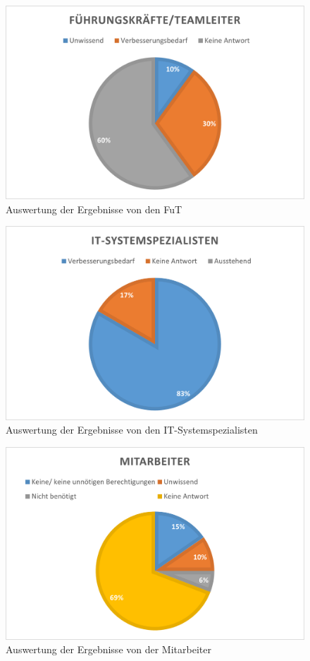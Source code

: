 \begin{figure}[h!]
 \centering
 \includegraphics[width=1\textwidth]{gfx/Picture/FuT.PNG}
 \caption{Auswertung der Ergebnisse von den \ac{FuT}}
 \label{fig:Fut}
\end{figure}
\begin{figure}[h!]
 \centering
 \includegraphics[width=1\textwidth]{gfx/Picture/IT.PNG}
 \caption{Auswertung der Ergebnisse von den IT-Systemspezialisten}
 \label{fig:IT}
\end{figure}
\begin{figure}[h!]
 \centering
 \includegraphics[width=1\textwidth]{gfx/Picture/Mitarbeiter.PNG}
 \caption{Auswertung der Ergebnisse von der Mitarbeiter}
 \label{fig:Mit}
\end{figure}

